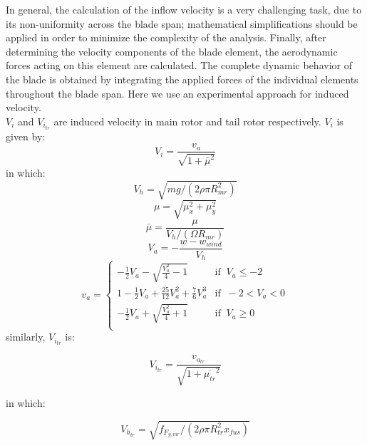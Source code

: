 In general, the calculation of the inflow velocity is a very challenging task, due to its non-uniformity across the blade span; mathematical simplifications should be applied in order to minimize the complexity of the analysis. Finally, after determining the velocity components
of the blade element, the aerodynamic forces acting on this element are calculated.
The complete dynamic behavior of the blade is obtained by integrating the applied
forces of the individual elements throughout the blade span. Here we use an experimental approach for induced velocity. \\
$V_i$ and $V_{i_{tr}}$ are induced velocity in main rotor and tail rotor respectively. $V_i$ is given by:
\begin{equation}
	V_i=\frac{v_a}{\sqrt{1+\bar{\mu}^2}}
\end{equation}
in which:
\begin{equation}
	V_h=\sqrt{mg/(2\rho \pi R_{mr}^2)}
\end{equation}
\begin{equation}
	\mu=\sqrt{\mu_x^2+\mu_y^2} 
\end{equation}
\begin{equation}
	\bar{\mu}=\frac{\mu}{V_h/(\Omega R_{mr})} 
\end{equation}
\begin{equation}
	V_a=-\frac{w-w_{wind}}{V_h}
\end{equation}
\begin{equation}
	v_a = \left\{
	\begin{array}{ll}
		-\frac{1}{2} V_a-\sqrt{\frac{V_a^2}{4}-1} & \mbox{if } \ V_a 	\leqslant -2 \\
		1-\frac{1}{2} V_a+\frac{25}{12} V_a^2 +\frac{7}{6} V_a^3 & \mbox{if } \ -2<V_a<0 \\
		-\frac{1}{2} V_a+\sqrt{\frac{V_a^2}{4}+1} & \mbox{if } \ V_a	\geqslant 0 \\
	\end{array}
	\right.
	\label{vamr}
\end{equation}
similarly, $V_{i_{tr}}$ is:

\begin{equation}
	V_{i_{tr}}=\frac{v_{a_{tr}}}{\sqrt{1+\overline{\mu_{tr}}^2}}
\end{equation}

in which:

\begin{equation}
	V_{h_{tr}}=\sqrt{f_{F_{y,mr}}/(2\rho \pi R_{tr}^2 x_{fus} )}
\end{equation}

